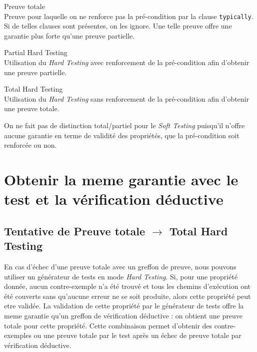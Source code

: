 \begin{definition}{Preuve totale}\hfill \\
  Preuve pour laquelle on ne renforce pas la pré-condition par la clause
  \texttt{typically}. Si de telles clauses sont présentes, on les ignore. Une
  telle preuve offre une garantie plus forte qu'une preuve partielle.
\end{definition}

\begin{definition}{Partial Hard Testing}\hfill \\
  Utilisation du {\em Hard Testing} avec renforcement de la pré-condition afin
  d'obtenir une preuve partielle.
\end{definition}

\begin{definition}{Total Hard Testing}\hfill \\
  Utilisation du {\em Hard Testing} sans renforcement de la pré-condition afin
  d'obtenir une preuve totale.
\end{definition}

On ne fait pas de distinction total/partiel pour le {\em Soft Testing} puisqu'il
n'offre aucune garantie en terme de validité des propriétés, que la
pré-condition soit renforcée ou non.



\section{Obtenir la meme garantie avec le test et la vérification déductive}

\subsection{Tentative de Preuve totale $\rightarrow$ Total Hard Testing}

En cas d'échec d'une preuve totale avec un greffon de preuve, nous pouvons
utiliser un générateur de tests en mode {\em Hard Testing}. Si, pour une
propriété donnée, aucun contre-exemple n'a été trouvé et tous les chemins
d'exécution ont été couverts sans qu'aucune erreur ne se soit produite, alors
cette propriété peut etre validée. La validation de cette propriété par le
générateur de tests offre la meme garantie qu'un greffon de vérification
déductive : on obtient une preuve totale pour cette propriété.
Cette combinaison permet d'obtenir des contre-exemples ou une preuve totale par
le test après un échec de preuve totale par vérification déductive.

